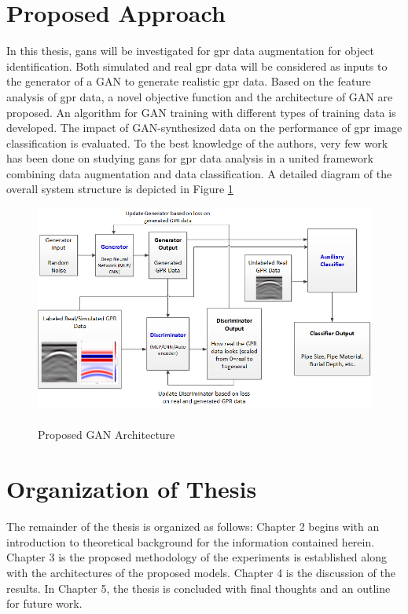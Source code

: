 \section{Proposed Approach}
\hspace{0.5in}In this thesis, \acrfull{gans} will be investigated for \acrshort{gpr} data augmentation for object identification. Both simulated and real \acrshort{gpr} data will be considered as inputs to the generator of a GAN to generate realistic \acrshort{gpr} data. Based on the feature analysis of \acrshort{gpr} data, a novel objective function and the architecture of GAN are proposed. An algorithm for GAN training with different types of training data is developed. The impact of GAN-synthesized data on the performance of \acrshort{gpr} image classification is evaluated. To the best knowledge of the authors, very few work has been done on studying \acrshort{gans} for \acrshort{gpr} data analysis in a united framework combining data augmentation and data classification. A detailed diagram of the overall system structure is depicted in Figure \ref{fig:GAN_Architecture}
\vspace{0.5\baselineskip}
\begin{figure}[H]
  \centering
  \includegraphics[width=1.0\linewidth]{figures/GAN_Figure.png}
  \caption{\\Proposed GAN Architecture}
  \label{fig:GAN_Architecture}
\end{figure}
\section{Organization of Thesis}
\hspace{0.5in}The remainder of the thesis is organized as follows: Chapter 2 begins with an introduction to theoretical background for the information contained herein. Chapter 3 is the proposed methodology of the experiments is established along with the architectures of the proposed models. Chapter 4 is the discussion of the results. In Chapter 5, the thesis is concluded with final thoughts and an outline for future work.